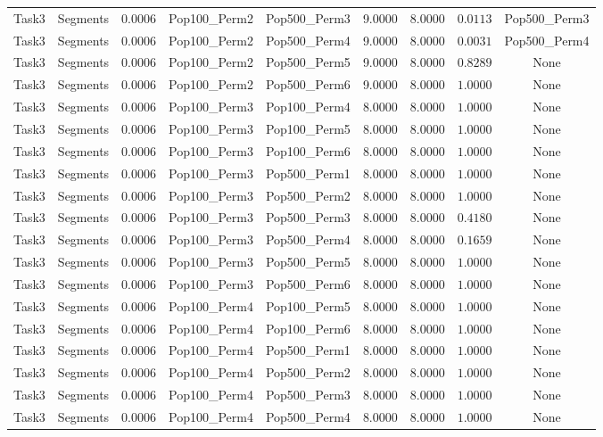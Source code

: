 \documentclass[8pt]{article}
\begin{document}
\begin{longtable}{llccccccc}
Task3 & Segments & $0.0006$ & Pop100\_Perm2 & Pop500\_Perm3 & 9.0000 & 8.0000 & $0.0113$ & Pop500\_Perm3 \\
Task3 & Segments & $0.0006$ & Pop100\_Perm2 & Pop500\_Perm4 & 9.0000 & 8.0000 & $0.0031$ & Pop500\_Perm4 \\
Task3 & Segments & $0.0006$ & Pop100\_Perm2 & Pop500\_Perm5 & 9.0000 & 8.0000 & $0.8289$ & None \\
Task3 & Segments & $0.0006$ & Pop100\_Perm2 & Pop500\_Perm6 & 9.0000 & 8.0000 & $1.0000$ & None \\
Task3 & Segments & $0.0006$ & Pop100\_Perm3 & Pop100\_Perm4 & 8.0000 & 8.0000 & $1.0000$ & None \\
Task3 & Segments & $0.0006$ & Pop100\_Perm3 & Pop100\_Perm5 & 8.0000 & 8.0000 & $1.0000$ & None \\
Task3 & Segments & $0.0006$ & Pop100\_Perm3 & Pop100\_Perm6 & 8.0000 & 8.0000 & $1.0000$ & None \\
Task3 & Segments & $0.0006$ & Pop100\_Perm3 & Pop500\_Perm1 & 8.0000 & 8.0000 & $1.0000$ & None \\
Task3 & Segments & $0.0006$ & Pop100\_Perm3 & Pop500\_Perm2 & 8.0000 & 8.0000 & $1.0000$ & None \\
Task3 & Segments & $0.0006$ & Pop100\_Perm3 & Pop500\_Perm3 & 8.0000 & 8.0000 & $0.4180$ & None \\
Task3 & Segments & $0.0006$ & Pop100\_Perm3 & Pop500\_Perm4 & 8.0000 & 8.0000 & $0.1659$ & None \\
Task3 & Segments & $0.0006$ & Pop100\_Perm3 & Pop500\_Perm5 & 8.0000 & 8.0000 & $1.0000$ & None \\
Task3 & Segments & $0.0006$ & Pop100\_Perm3 & Pop500\_Perm6 & 8.0000 & 8.0000 & $1.0000$ & None \\
Task3 & Segments & $0.0006$ & Pop100\_Perm4 & Pop100\_Perm5 & 8.0000 & 8.0000 & $1.0000$ & None \\
Task3 & Segments & $0.0006$ & Pop100\_Perm4 & Pop100\_Perm6 & 8.0000 & 8.0000 & $1.0000$ & None \\
Task3 & Segments & $0.0006$ & Pop100\_Perm4 & Pop500\_Perm1 & 8.0000 & 8.0000 & $1.0000$ & None \\
Task3 & Segments & $0.0006$ & Pop100\_Perm4 & Pop500\_Perm2 & 8.0000 & 8.0000 & $1.0000$ & None \\
Task3 & Segments & $0.0006$ & Pop100\_Perm4 & Pop500\_Perm3 & 8.0000 & 8.0000 & $1.0000$ & None \\
Task3 & Segments & $0.0006$ & Pop100\_Perm4 & Pop500\_Perm4 & 8.0000 & 8.0000 & $1.0000$ & None \\

\end{longtable}
\end{document}
